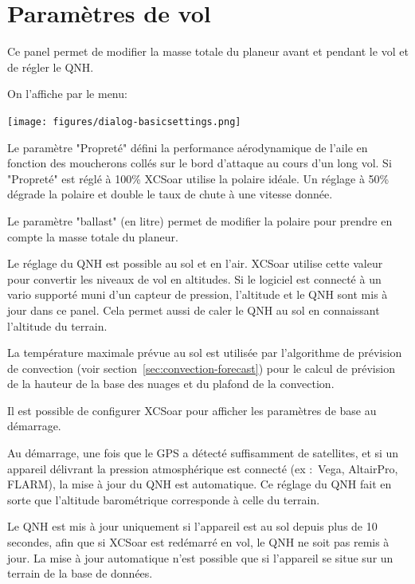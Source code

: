 \section{Paramètres de vol}\label{sec:flight-setup}
Ce panel permet de modifier la masse totale du planeur avant et pendant le vol et de régler le QNH.

On l'affiche par le menu:
\begin{quote}
\blink{}
\end{quote}

\begin{center}
\texttt{[image: figures/dialog-basicsettings.png]}
\end{center}

Le paramètre "Propreté" défini la performance aérodynamique de l'aile en fonction des moucherons collés sur le bord d'attaque au cours d'un long vol. Si "Propreté" est réglé à 100\% XCSoar utilise la polaire idéale. Un réglage à 50\% dégrade la polaire et double le taux de chute à une vitesse donnée.

Le paramètre "ballast" (en litre) permet de modifier la polaire pour prendre en compte la masse totale du planeur.

Le réglage du QNH est possible au sol et en l'air. XCSoar utilise cette valeur pour convertir les niveaux de vol en altitudes. Si le logiciel est connecté à un vario supporté muni d'un capteur de pression, l'altitude et le QNH sont mis à jour dans ce panel. Cela permet aussi de caler le QNH au sol en connaissant l'altitude du terrain.

La température maximale prévue au sol est utilisée par l'algorithme de prévision de convection (voir section~\ref{sec:convection-forecast}) pour le calcul de prévision de la hauteur de la base des nuages et du plafond de la convection.

\tip Il est possible de configurer XCSoar pour afficher les paramètres de base au démarrage.

Au démarrage, une fois que le GPS a détecté suffisamment de satellites,  et si un appareil délivrant la pression atmosphérique est connecté  (ex :\ Vega, AltairPro, FLARM), la mise à jour du QNH est automatique. Ce réglage du QNH fait en sorte que l'altitude barométrique corresponde à celle du terrain.

Le QNH est mis à jour uniquement si l'appareil est au sol depuis plus de 10 secondes, afin que si XCSoar est redémarré en vol, le QNH ne soit pas remis à jour. La mise à jour automatique n'est possible que si l'appareil se situe sur un terrain de la base de données.

